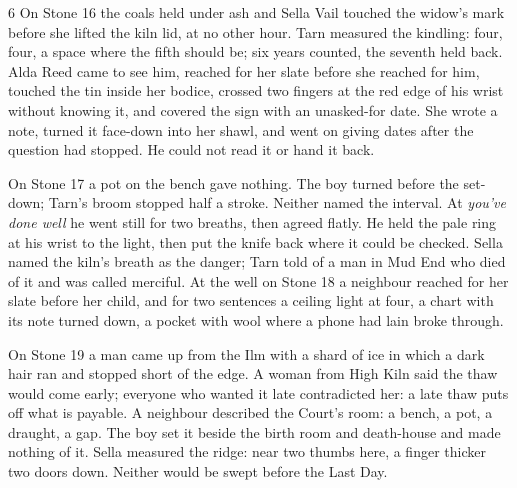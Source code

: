 




\CRtailpiece
\begin{CRchronicle}{6}
On Stone 16 the coals held under ash and Sella Vail touched the widow’s mark before she lifted the kiln lid, at no other hour. Tarn measured the kindling: four, four, a space where the fifth should be; six years counted, the seventh held back. Alda Reed came to see him, reached for her slate before she reached for him, touched the tin inside her bodice, crossed two fingers at the red edge of his wrist without knowing it, and covered the sign with an unasked-for date. She wrote a note, turned it face-down into her shawl, and went on giving dates after the question had stopped. He could not read it or hand it back.

On Stone 17 a pot on the bench gave nothing. The boy turned before the set-down; Tarn’s broom stopped half a stroke. Neither named the interval. At \emph{you’ve done well} he went still for two breaths, then agreed flatly. He held the pale ring at his wrist to the light, then put the knife back where it could be checked. Sella named the kiln’s breath as the danger; Tarn told of a man in Mud End who died of it and was called merciful. At the well on Stone 18 a neighbour reached for her slate before her child, and for two sentences a ceiling light at four, a chart with its note turned down, a pocket with wool where a phone had lain broke through.

On Stone 19 a man came up from the Ilm with a shard of ice in which a dark hair ran and stopped short of the edge. A woman from High Kiln said the thaw would come early; everyone who wanted it late contradicted her: a late thaw puts off what is payable. A neighbour described the Court’s room: a bench, a pot, a draught, a gap. The boy set it beside the birth room and death-house and made nothing of it. Sella measured the ridge: near two thumbs here, a finger thicker two doors down. Neither would be swept before the Last Day.


\end{CRchronicle}
